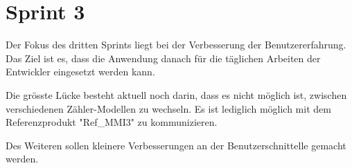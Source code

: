\section{Sprint 3}
Der Fokus des dritten Sprints liegt bei der Verbesserung der Benutzererfahrung.
Das Ziel ist es, dass die Anwendung danach für die täglichen Arbeiten der Entwickler eingesetzt werden kann.

Die grösste Lücke besteht aktuell noch darin, dass es nicht möglich ist, zwischen verschiedenen Zähler-Modellen zu wechseln.
Es ist lediglich möglich mit dem Referenzprodukt "Ref_MMI3" zu kommunizieren.

Des Weiteren sollen kleinere Verbesserungen an der Benutzerschnittelle gemacht werden.

